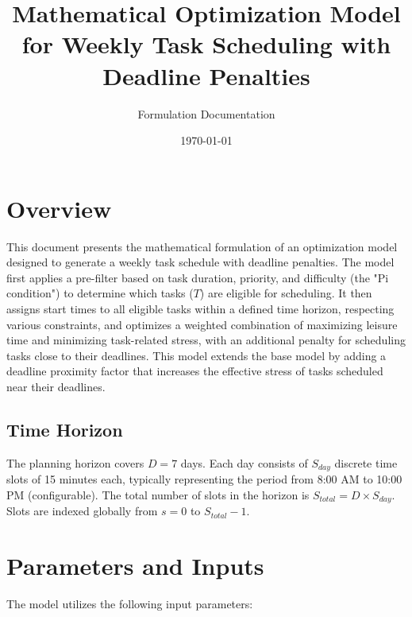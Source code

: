\documentclass{article}
\title{Mathematical Optimization Model for Weekly Task Scheduling with Deadline Penalties}
\author{Formulation Documentation}
\date{\today}
\begin{document}
\maketitle

\section{Overview}

This document presents the mathematical formulation of an optimization model designed to generate a weekly task schedule with deadline penalties. The model first applies a pre-filter based on task duration, priority, and difficulty (the "Pi condition") to determine which tasks ($T$) are eligible for scheduling. It then assigns start times to all eligible tasks within a defined time horizon, respecting various constraints, and optimizes a weighted combination of maximizing leisure time and minimizing task-related stress, with an additional penalty for scheduling tasks close to their deadlines. This model extends the base model by adding a deadline proximity factor that increases the effective stress of tasks scheduled near their deadlines.

\subsection*{Time Horizon}
The planning horizon covers $D = 7$ days. Each day consists of $S_{day}$ discrete time slots of 15 minutes each, typically representing the period from 8:00 AM to 10:00 PM (configurable). The total number of slots in the horizon is $S_{total} = D \times S_{day}$. Slots are indexed globally from $s = 0$ to $S_{total}-1$.

\section{Parameters and Inputs}

The model utilizes the following input parameters:
\end{document}
